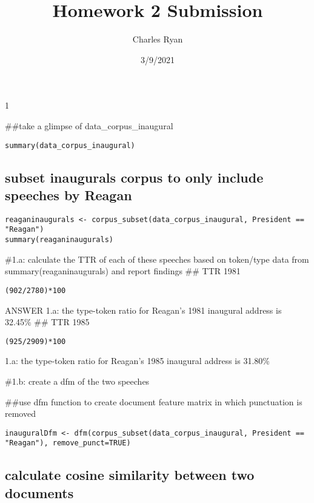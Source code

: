 \documentclass[
]{article}
\title{Homework 2 Submission}
\author{Charles Ryan}
\date{3/9/2021}
\begin{document}
\maketitle

1

\#\#take a glimpse of data\_corpus\_inaugural

\begin{verbatim}
summary(data_corpus_inaugural)
\end{verbatim}

\hypertarget{subset-inaugurals-corpus-to-only-include-speeches-by-reagan}{%
\subsection{subset inaugurals corpus to only include speeches by
Reagan}\label{subset-inaugurals-corpus-to-only-include-speeches-by-reagan}}

\begin{verbatim}
reaganinaugurals <- corpus_subset(data_corpus_inaugural, President == "Reagan")
summary(reaganinaugurals)
\end{verbatim}

\#1.a: calculate the TTR of each of these speeches based on token/type
data from summary(reaganinaugurals) and report findings \#\# TTR 1981

\begin{verbatim}
(902/2780)*100
\end{verbatim}

ANSWER 1.a: the type-token ratio for Reagan's 1981 inaugural address is
32.45\% \#\# TTR 1985

\begin{verbatim}
(925/2909)*100
\end{verbatim}

1.a: the type-token ratio for Reagan's 1985 inaugural address is 31.80\%

\#1.b: create a dfm of the two speeches

\#\#use dfm function to create document feature matrix in which
punctuation is removed

\begin{verbatim}
inauguralDfm <- dfm(corpus_subset(data_corpus_inaugural, President == "Reagan"), remove_punct=TRUE)
\end{verbatim}

\hypertarget{calculate-cosine-similarity-between-two-documents}{%
\subsection{calculate cosine similarity between two
documents}\label{calculate-cosine-similarity-between-two-documents}}
\end{document}
